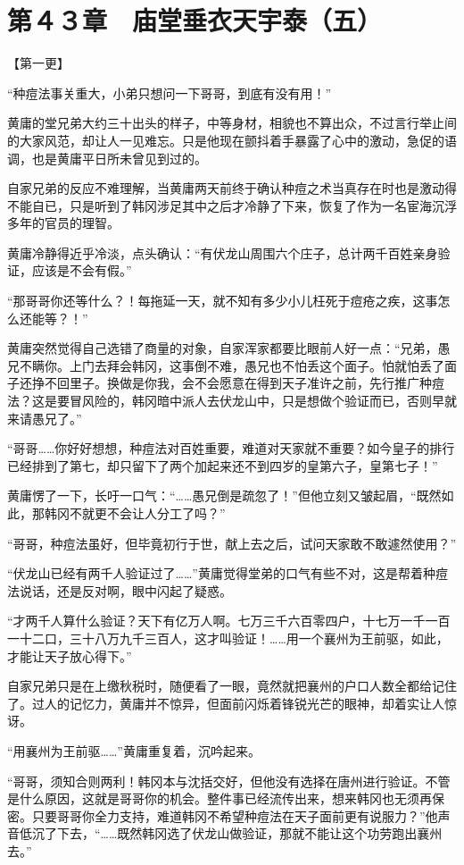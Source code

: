 \section{第４３章　庙堂垂衣天宇泰（五）}

【第一更】

“种痘法事关重大，小弟只想问一下哥哥，到底有没有用！”

黄庸的堂兄弟大约三十出头的样子，中等身材，相貌也不算出众，不过言行举止间的大家风范，却让人一见难忘。只是他现在颤抖着手暴露了心中的激动，急促的语调，也是黄庸平日所未曾见到过的。

自家兄弟的反应不难理解，当黄庸两天前终于确认种痘之术当真存在时也是激动得不能自已，只是听到了韩冈涉足其中之后才冷静了下来，恢复了作为一名宦海沉浮多年的官员的理智。

黄庸冷静得近乎冷淡，点头确认：“有伏龙山周围六个庄子，总计两千百姓亲身验证，应该是不会有假。”

“那哥哥你还等什么？！每拖延一天，就不知有多少小儿枉死于痘疮之疾，这事怎么还能等？！”

黄庸突然觉得自己选错了商量的对象，自家浑家都要比眼前人好一点：“兄弟，愚兄不瞒你。上门去拜会韩冈，这事倒不难，愚兄也不怕丢这个面子。怕就怕丢了面子还挣不回里子。换做是你我，会不会愿意在得到天子准许之前，先行推广种痘法？这是要冒风险的，韩冈暗中派人去伏龙山中，只是想做个验证而已，否则早就来请愚兄了。”

“哥哥……你好好想想，种痘法对百姓重要，难道对天家就不重要？如今皇子的排行已经排到了第七，却只留下了两个加起来还不到四岁的皇第六子，皇第七子！”

黄庸愣了一下，长吁一口气：“……愚兄倒是疏忽了！”但他立刻又皱起眉，“既然如此，那韩冈不就更不会让人分工了吗？”

“哥哥，种痘法虽好，但毕竟初行于世，献上去之后，试问天家敢不敢遽然使用？”

“伏龙山已经有两千人验证过了……”黄庸觉得堂弟的口气有些不对，这是帮着种痘法说话，还是反对啊，眼中闪起了疑惑。

“才两千人算什么验证？天下有亿万人啊。七万三千六百零四户，十七万一千一百一十二口，三十八万九千三百人，这才叫验证！……用一个襄州为王前驱，如此，才能让天子放心得下。”

自家兄弟只是在上缴秋税时，随便看了一眼，竟然就把襄州的户口人数全都给记住了。过人的记忆力，黄庸并不惊异，但面前闪烁着锋锐光芒的眼神，却着实让人惊讶。

“用襄州为王前驱……”黄庸重复着，沉吟起来。

“哥哥，须知合则两利！韩冈本与沈括交好，但他没有选择在唐州进行验证。不管是什么原因，这就是哥哥你的机会。整件事已经流传出来，想来韩冈也无须再保密。只要哥哥你全力支持，难道韩冈不希望种痘法在天子面前更有说服力？”他声音低沉了下去，“……既然韩冈选了伏龙山做验证，那就不能让这个功劳跑出襄州去。”

